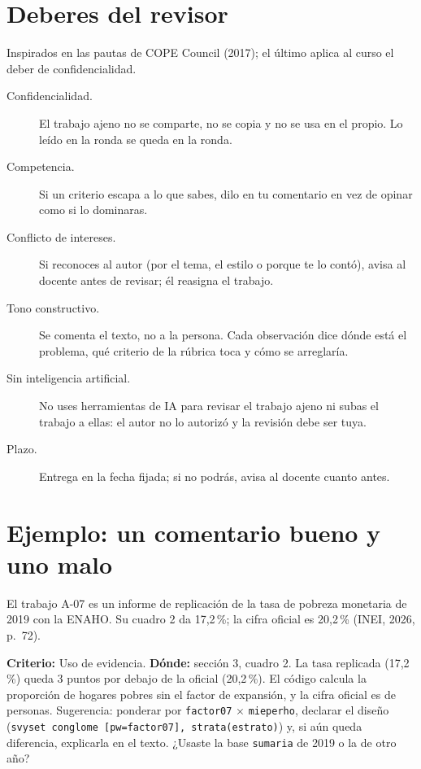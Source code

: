 \documentclass{academic-report}
\begin{document}
\section*{Deberes del revisor}
Inspirados en las pautas de COPE Council (2017); el último aplica al curso el deber de
confidencialidad.
\begin{description}
  \item[Confidencialidad.] El trabajo ajeno no se comparte, no se copia y no se usa en el
        propio. Lo leído en la ronda se queda en la ronda.
  \item[Competencia.] Si un criterio escapa a lo que sabes, dilo en tu comentario en vez de
        opinar como si lo dominaras.
  \item[Conflicto de intereses.] Si reconoces al autor (por el tema, el estilo o porque te lo
        contó), avisa al docente antes de revisar; él reasigna el trabajo.
  \item[Tono constructivo.] Se comenta el texto, no a la persona. Cada observación dice dónde
        está el problema, qué criterio de la rúbrica toca y cómo se arreglaría.
  \item[Sin inteligencia artificial.] No uses herramientas de IA para revisar el trabajo ajeno ni
        subas el trabajo a ellas: el autor no lo autorizó y la revisión debe ser tuya.
  \item[Plazo.] Entrega en la fecha fijada; si no podrás, avisa al docente cuanto antes.
\end{description}

\section*{Ejemplo: un comentario bueno y uno malo}
El trabajo A-07 es un informe de replicación de la tasa de pobreza monetaria de 2019 con la
ENAHO. Su cuadro 2 da 17,2\,\%; la cifra oficial es 20,2\,\% (INEI, 2026, p.~72).

\begin{ejemplo}
\textbf{Criterio:} Uso de evidencia. \textbf{Dónde:} sección 3, cuadro 2.
La tasa replicada (17,2\,\%) queda 3 puntos por debajo de la oficial (20,2\,\%). El código
calcula la proporción de hogares pobres sin el factor de expansión, y la cifra
oficial es de personas. Sugerencia: ponderar por \texttt{factor07} $\times$ \texttt{mieperho}, declarar
el diseño (\texttt{svyset conglome [pw=factor07], strata(estrato)}) y, si aún queda
diferencia, explicarla en el texto. ¿Usaste la base \texttt{sumaria} de 2019 o la de otro año?
\end{ejemplo}
\end{document}
